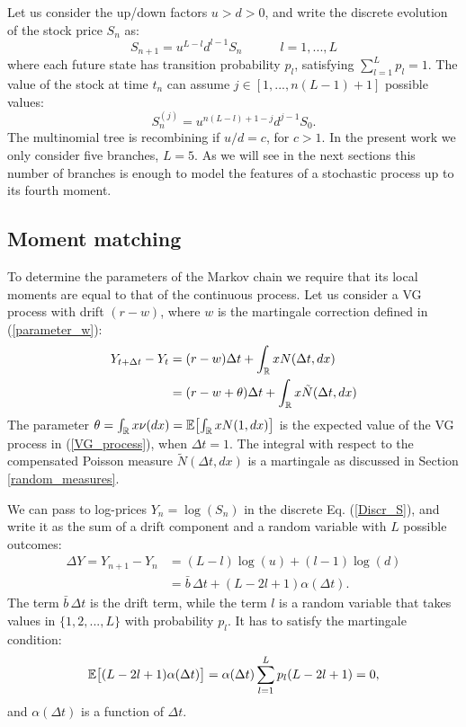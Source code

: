 Let us consider the up/down factors $u>d>0$, and write the discrete evolution of the stock price $S_n$ as:
\begin{equation}\label{Discr_S}
  S_{n+1} = u^{L-l}d^{l-1} S_n  \hspace{3em} l=1, ... , L  
\end{equation}
where each future state has transition probability $p_l$, satisfying $\sum_{l=1}^L p_l = 1$.
The value of the stock at time $t_n$ can assume $j \in [1,...,n(L-1)+1]$ possible values:
\begin{equation}\label{Discr_S2}
  S_{n}^{(j)} = u^{n(L-l)+1-j}d^{j-1} S_0.  
\end{equation}
The multinomial tree is recombining if $u/d = c$, for $c>1$.
In the present work we only consider five branches, $L=5$. As we will see in the next sections this number of branches is 
enough to model the features of a stochastic process up to its fourth moment.


\subsection{Moment matching}

To determine the parameters of the Markov chain we require that its local moments are equal to that of the continuous process.
Let us consider a VG process with drift $(r-w)$, where $w$ is the martingale correction defined in (\ref{parameter_w}): 
\begin{align}\label{log_martingale}
 Y_{t+\Delta t}-Y_t &= (r-w)\Delta t + \int_{\mathbb{R}} x N(\Delta t,dx) \\ \nonumber
		    &= (r-w + \theta)\Delta t + \int_{\mathbb{R}} x \tilde N(\Delta t,dx)
\end{align}
The parameter $\theta = \int_{\mathbb{R}} x \nu(dx) = \mathbb{E} \bigl[ \int_{\mathbb{R}} x N(1,dx) \bigr]$ is the expected value of the VG process in (\ref{VG_process}), 
when $\Delta t=1$. 
The integral with respect to the compensated Poisson measure $\tilde N(\Delta t,dx)$ is a martingale as discussed in Section \ref{random_measures}.

We can pass to log-prices $Y_n = \log(S_n)$ in the discrete Eq. (\ref{Discr_S}), and write it as the sum of a drift component and a 
random variable with $L$ possible outcomes:
\begin{align}\label{Discr_Y}
 \Delta Y = Y_{n+1} - Y_n &= (L-l) \log(u) + (l-1) \log(d) \\ \nonumber
  &= \bar b\, \Delta t + (L-2l+1) \alpha(\Delta t).
\end{align}
The term $\bar b\, \Delta t$ is the drift term, while the term $l$ is a random variable that takes values in $\{1,2,...,L\}$ with probability $p_l$. 
It has to satisfy the martingale condition:
$$ \mathbb{E} \bigl[(L-2l+1) \alpha(\Delta t) \bigr] = \alpha(\Delta t) \sum_{l=1}^L p_l (L-2l+1) = 0, $$
and $\alpha(\Delta t)$ is a function of $\Delta t$.

